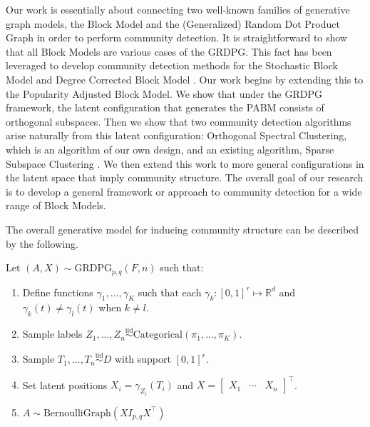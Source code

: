 \documentclass[
  11pt,
]{article}
\providecommand{\tightlist}{%
  \setlength{\itemsep}{0pt}\setlength{\parskip}{0pt}}
\begin{document}
Our work is essentially about connecting two well-known families of
generative graph models, the Block Model and the (Generalized) Random
Dot Product Graph \cite{rubindelanchy2017statistical} in order to
perform community detection. It is straightforward to show that all
Block Models are various cases of the GRDPG. This fact has been
leveraged to develop community detection methods
\cite{athreya2017statistical, lyzinski2014, rubindelanchy2017statistical}
for the Stochastic Block Model \cite{doi:10.1080/0022250X.1971.9989788}
and Degree Corrected Block Model \cite{Karrer_2011}. Our work begins by
extending this to the Popularity Adjusted Block Model. We show that
under the GRDPG framework, the latent configuration that generates the
PABM consists of orthogonal subspaces. Then we show that two community
detection algorithms arise naturally from this latent configuration:
Orthogonal Spectral Clustering, which is an algorithm of our own design,
and an existing algorithm, Sparse Subspace Clustering \cite{5206547}. We
then extend this work to more general configurations in the latent space
that imply community structure. The overall goal of our research is to
develop a general framework or approach to community detection for a
wide range of Block Models.

\newpage

The overall generative model for inducing community structure can be
described by the following.

Let \((A, X) \sim \text{GRDPG}_{p, q}(F, n)\) such that:

\begin{enumerate}
\def\labelenumi{\arabic{enumi}.}
\tightlist
\item
  Define functions \(\gamma_1, ..., \gamma_K\) such that each
  \(\gamma_k : [0, 1]^r \mapsto \mathbb{R}^d\) and
  \(\gamma_k(t) \neq \gamma_l(t)\) when \(k \neq l\).
\item
  Sample labels
  \(Z_1, ..., Z_n \stackrel{\text{iid}}{\sim}\text{Categorical}(\pi_1, ..., \pi_K)\).
\item
  Sample \(T_1, ..., T_n \stackrel{\text{iid}}{\sim}D\) with support
  \([0, 1]^r\).
\item
  Set latent positions \(X_i = \gamma_{Z_i}(T_i)\) and
  \(X = \begin{bmatrix} X_1 & \cdots & X_n \end{bmatrix}^\top\).
\item
  \(A \sim \text{BernoulliGraph}(X I_{p, q} X^\top)\)
\end{enumerate}
\end{document}
